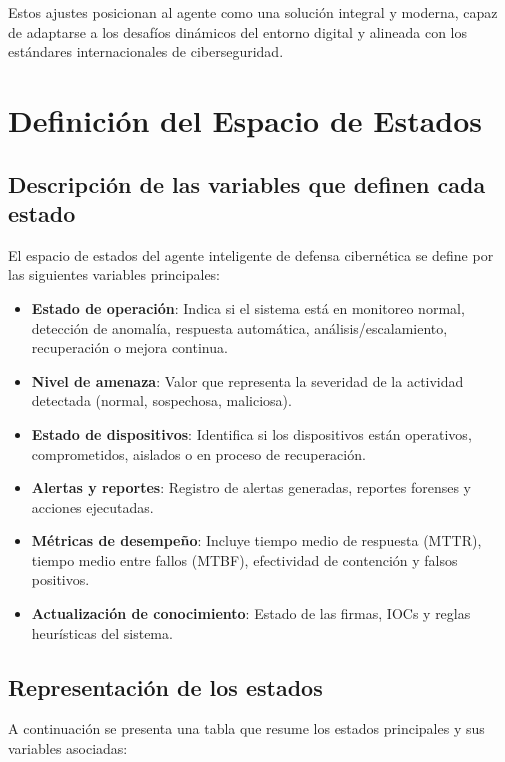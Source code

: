 \documentclass[letterpaper, 12pt]{report}
\begin{document}
Estos ajustes posicionan al agente como una solución integral y moderna, capaz
de adaptarse a los desafíos dinámicos del entorno digital y alineada con los
estándares internacionales de ciberseguridad.

\section{Definición del Espacio de Estados}

\subsection{Descripción de las variables que definen cada estado}
El espacio de estados del agente inteligente de defensa cibernética se define
por las siguientes variables principales:

\begin{itemize}
      \item \textbf{Estado de operación}: Indica si el sistema está en monitoreo normal, detección de anomalía, respuesta automática, análisis/escalamiento, recuperación o mejora continua.
      \item \textbf{Nivel de amenaza}: Valor que representa la severidad de la actividad detectada (normal, sospechosa, maliciosa).
      \item \textbf{Estado de dispositivos}: Identifica si los dispositivos están operativos, comprometidos, aislados o en proceso de recuperación.
      \item \textbf{Alertas y reportes}: Registro de alertas generadas, reportes forenses y acciones ejecutadas.
      \item \textbf{Métricas de desempeño}: Incluye tiempo medio de respuesta (MTTR), tiempo medio entre fallos (MTBF), efectividad de contención y falsos positivos.
      \item \textbf{Actualización de conocimiento}: Estado de las firmas, IOCs y reglas heurísticas del sistema.
\end{itemize}

\subsection{Representación de los estados}
A continuación se presenta una tabla que resume los estados principales y sus
variables asociadas:
\end{document}
